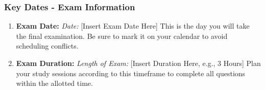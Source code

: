 \documentclass[aspectratio=169]{beamer}
\begin{document}
\begin{frame}[fragile]
    \frametitle{Key Dates - Exam Information}
    \begin{enumerate}
        \item \textbf{Exam Date:}  
        \newline
        \textit{Date:} [Insert Exam Date Here]  
        \newline
        This is the day you will take the final examination. 
        Be sure to mark it on your calendar to avoid scheduling conflicts.
        
        \item \textbf{Exam Duration:}  
        \newline
        \textit{Length of Exam:} [Insert Duration Here, e.g., 3 Hours]  
        \newline
        Plan your study sessions according to this timeframe to complete all questions within the allotted time.
    \end{enumerate}
\end{frame}
\end{document}

